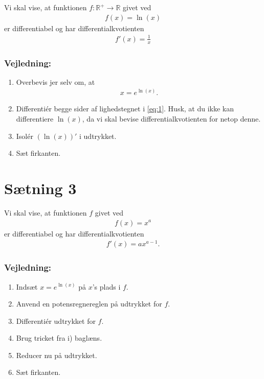 Vi skal vise, at funktionen $f:\mathbb{R}^+ \to \mathbb{R}$ givet ved
\begin{align*}
	f(x) = \ln(x)
\end{align*}
er differentiabel og har differentialkvotienten
\begin{align*}
	f'(x) = \frac{1}{x}
\end{align*}
\subsubsection*{Vejledning:}
\begin{enumerate}[label=\roman*)]
	\item Overbevis jer selv om, at 
	\begin{align}\label{eq:1}
		x = e^{\ln(x)}.
	\end{align}
	\item Differentiér begge sider af lighedstegnet i \eqref{eq:1}. Husk, at du ikke kan differentiere 
	$\ln(x)$,
	da vi skal bevise differentialkvotienten for netop denne. 
	\item Isolér $(\ln(x))'$ i udtrykket. 
	\item Sæt firkanten. 
\end{enumerate}

\newpage
\section*{Sætning 3}

Vi skal vise, at funktionen $f$ givet ved
\begin{align*}
	f(x) = x^a
\end{align*}
er differentiabel og har differentialkvotienten
\begin{align*}
	f'(x) = ax^{a-1}.
\end{align*}
\subsubsection*{Vejledning:}
\begin{enumerate}[label=\roman*)]
	\item Indsæt $x = e^{\ln(x)}$ på $x$'s plads i $f$. 
	\item Anvend en potensregnereglen på udtrykket for $f$.
	\item Differentiér udtrykket for $f$. 
	\item Brug tricket fra i) baglæns.
	\item Reducer nu på udtrykket.
	\item Sæt firkanten. 
\end{enumerate}

